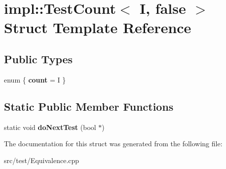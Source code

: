 \hypertarget{structimpl_1_1TestCount_3_01I_00_01false_01_4}{}\section{impl\+:\+:Test\+Count$<$ I, false $>$ Struct Template Reference}
\label{structimpl_1_1TestCount_3_01I_00_01false_01_4}
\subsection*{Public Types}
\begin{DoxyCompactItemize}
\item 
\mbox{\label{structimpl_1_1TestCount_3_01I_00_01false_01_4_aa02a02a012f021a76cec2a13911ca4b7}} 
enum \{ {\bfseries count} = I
 \}
\end{DoxyCompactItemize}
\subsection*{Static Public Member Functions}
\begin{DoxyCompactItemize}
\item 
\mbox{\label{structimpl_1_1TestCount_3_01I_00_01false_01_4_a788ccb8cc8b9f3851b36963ef04a35fc}} 
static void {\bfseries do\+Next\+Test} (bool $\ast$)
\end{DoxyCompactItemize}


The documentation for this struct was generated from the following file\+:\begin{DoxyCompactItemize}
\item 
src/test/Equivalence.\+cpp\end{DoxyCompactItemize}
